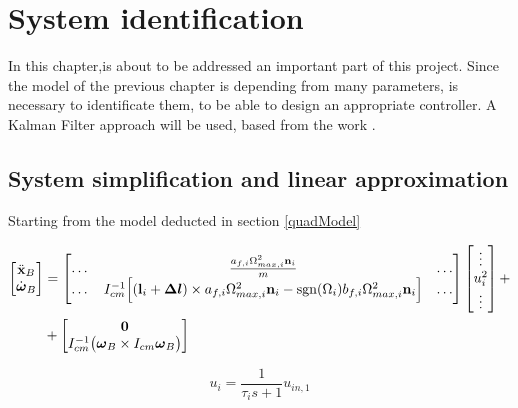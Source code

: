 \chapter{System identification}
\label{systemIdentification}

In this chapter,is about to be addressed an important part of this project. Since the model of the previous chapter is depending from many parameters, is necessary to identificate them, to be able to design an appropriate controller. A Kalman Filter approach will be used, based from the work \cite{modelIdentification}.

\section{System simplification and linear approximation}
\label{linearization}

Starting from the model deducted in section \ref{quadModel}

\begin{equation}
	\begin{split}
		\begin{bmatrix}
			\ddot{\mathbf{x}}_B \\
			\dot{\boldsymbol{\omega}}_B
		\end{bmatrix}
		&=
		\begin{bmatrix}
			\dots & \frac{a_{f,i}\Omega_{max,i}^2\mathbf{n}_i}{m} & \dots \\
			\dots & I_{cm}^{-1}\Big[ (\mathbf{l}_i+\boldsymbol{\Delta l})\times a_{f,i}\Omega^2_{max,i}\mathbf{n}_i-\operatorname*{sgn}(\Omega_i)b_{f,i}\Omega_{max,i}^2\mathbf{n}_i\Big] & \dots
		\end{bmatrix}
		\begin{bmatrix}
			\vdots \\
			u_i^2 \\
			\vdots
		\end{bmatrix}
		+ \\
		&+
		\begin{bmatrix}
			\mathbf{0} \\
			I_{cm}^{-1}\bigl(\boldsymbol{\omega}_B \times I_{cm} \boldsymbol{\omega}_B \bigl)
		\end{bmatrix} \\
	\end{split}
	\label{eq:finalModel1a}
\end{equation}

\begin{equation}
	u_i = \frac{1}{\tau_is+1}u_{in,1}
	\label{eq:finalModel2a}
\end{equation}


